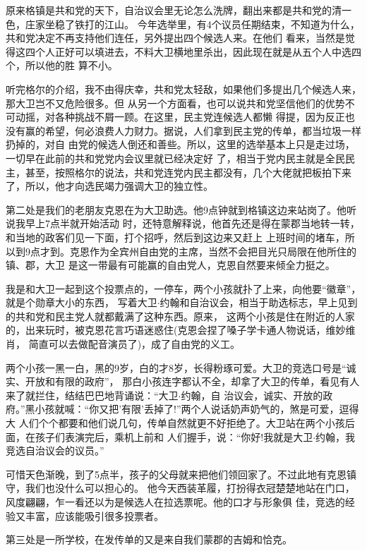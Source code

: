 ﻿\documentclass[11pt]{article}
\begin{document}
原来格镇是共和党的天下，自治议会里无论怎么洗牌，翻出来都是共和党的清一色，庄家坐稳了铁打的江山。
今年选举里，有4个议员任期结束，不知道为什么，共和党决定不再支持他们连任，另外提出四个候选人来。在他们
看来，当然是觉得这四个人正好可以填进去，不料大卫横地里杀出，因此现在就是从五个人中选四个，所以他的胜
算不小。

听完格尔的介绍，我不由得庆幸，共和党太轻敌，如果他们多提出几个候选人来，那大卫岂不又危险很多。但
从另一个方面看，也可以说共和党坚信他们的优势不可动摇，对各种挑战不屑一顾。在这里，民主党连候选人都懒
得提，因为反正也没有赢的希望，何必浪费人力财力。据说，人们拿到民主党的传单，都当垃圾一样扔掉的，对自
由党的候选人倒还和善些。所以，这里的选举基本上只是走过场，一切早在此前的共和党党内会议里就已经决定好
了，相当于党内民主就是全民民主，甚至，按照格尔的说法，共和党连党内民主都没有，几个大佬就把板拍下来
了，所以，他才向选民竭力强调大卫的独立性。

第二处是我们的老朋友克恩在为大卫助选。他9点钟就到格镇这边来站岗了。他听说我早上7点半就开始活动
时，还特意解释说，他首先还是得在蒙郡当地转一转，和当地的政客们见一下面，打个招呼，然后到这边来又赶上
上班时间的堵车，所以到9点才到。克恩作为全宾州自由党的主席，当然不会把目光只局限在他所住的镇、郡，大卫
是这一带最有可能赢的自由党人，克恩自然要来倾全力挺之。

我是和大卫一起到这个投票点的，一停车，两个小孩就扑了上来，向他要``徽章''，就是个勋章大小的东西，
写着大卫$\cdot$约翰和自治议会，相当于助选标志，早上见到的共和党和民主党人就都戴满了这种东西。原来，
这两个小孩是住在附近的人家的，出来玩时，被克恩花言巧语迷惑住(克恩会捏了嗓子学卡通人物说话，维妙维肖，
简直可以去做配音演员了)，成了自由党的义工。

两个小孩一黑一白，黑的9岁，白的才8岁，长得粉琢可爱。大卫的竞选口号是``诚实、开放和有限的政府''，
那白小孩连字都认不全，却拿了大卫的传单，看见有人来了就拦住，结结巴巴地背诵说：``大卫$\cdot$约翰，自
治议会，诚实、开放的政府。''黑小孩就喊：``你又把'有限'丢掉了!''两个人说话奶声奶气的，煞是可爱，逗得大
人们个个都要和他们说几句，传单自然就更不好拒绝了。大卫站在两个小孩后面，在孩子们表演完后，乘机上前和
人们握手，说：``你好!我就是大卫$\cdot$约翰，我竞选自治议会的议员。''

可惜天色渐晚，到了5点半，孩子的父母就来把他们领回家了。不过此地有克恩镇守，我们也没什么可以担心的。
他今天西装革履，打扮得衣冠楚楚地站在门口，风度翩翩，乍一看还以为是候选人在拉选票呢。他的口才与形象俱
佳，竞选的经验又丰富，应该能吸引很多投票者。

第三处是一所学校，在发传单的又是来自我们蒙郡的吉姆和恰克。
\end{document}
